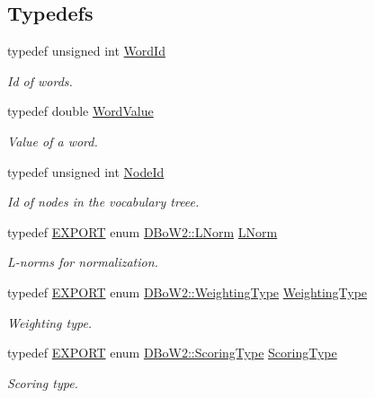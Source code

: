 \subsection*{Typedefs}
\begin{DoxyCompactItemize}
\item 
typedef unsigned int \mbox{\hyperlink{namespace_d_bo_w2_ab1a0d3283b2d4690a383372ed20bfeb5}{Word\+Id}}
\begin{DoxyCompactList}\small\item\em Id of words. \end{DoxyCompactList}\item 
typedef double \mbox{\hyperlink{namespace_d_bo_w2_a55fcd7333e591a38e96b91f41bc182f6}{Word\+Value}}
\begin{DoxyCompactList}\small\item\em Value of a word. \end{DoxyCompactList}\item 
typedef unsigned int \mbox{\hyperlink{namespace_d_bo_w2_a3a0fa9c50c0df508759362d6204566f2}{Node\+Id}}
\begin{DoxyCompactList}\small\item\em Id of nodes in the vocabulary treee. \end{DoxyCompactList}\item 
typedef \mbox{\hyperlink{_d_bo_w2_2_d_utils_2config_8h_a3472d8cdbb788d5f1815b3522595bc49}{E\+X\+P\+O\+RT}} enum \mbox{\hyperlink{namespace_d_bo_w2_a53e9e0bcfc25c861815e413a7cf3fa51}{D\+Bo\+W2\+::\+L\+Norm}} \mbox{\hyperlink{namespace_d_bo_w2_a350a8bb9e38231cbf68ef07399d7a0c8}{L\+Norm}}
\begin{DoxyCompactList}\small\item\em L-\/norms for normalization. \end{DoxyCompactList}\item 
typedef \mbox{\hyperlink{_d_bo_w2_2_d_utils_2config_8h_a3472d8cdbb788d5f1815b3522595bc49}{E\+X\+P\+O\+RT}} enum \mbox{\hyperlink{namespace_d_bo_w2_a5de5c8a307aca9a84ffefda2a9bc467a}{D\+Bo\+W2\+::\+Weighting\+Type}} \mbox{\hyperlink{namespace_d_bo_w2_a66be5c3cd2567ff15eeaf56fd55fffcc}{Weighting\+Type}}
\begin{DoxyCompactList}\small\item\em Weighting type. \end{DoxyCompactList}\item 
typedef \mbox{\hyperlink{_d_bo_w2_2_d_utils_2config_8h_a3472d8cdbb788d5f1815b3522595bc49}{E\+X\+P\+O\+RT}} enum \mbox{\hyperlink{namespace_d_bo_w2_aa252a592dd607c6e60dede06ceef2722}{D\+Bo\+W2\+::\+Scoring\+Type}} \mbox{\hyperlink{namespace_d_bo_w2_ad047d6578eacc8aaae7d9cbcd3ded537}{Scoring\+Type}}
\begin{DoxyCompactList}\small\item\em Scoring type. \end{DoxyCompactList}\end{DoxyCompactItemize}
